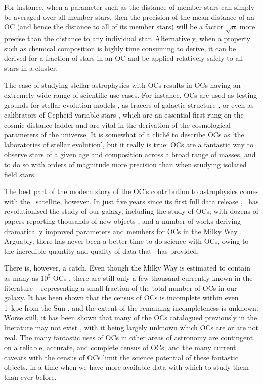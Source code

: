 For instance, when a parameter such as the distance of member stars can simply be averaged over all member stars, then the precision of the mean distance of an OC (and hence the distance to all of its member stars) will be a factor $\sqrt{n}$ more precise than the distance to any individual star. Alternatively, when a property such as chemical composition is highly time consuming to derive, it can be derived for a fraction of stars in an OC and be applied relatively safely to all stars in a cluster.

The ease of studying stellar astrophysics with OCs results in OCs having an extremely wide range of scientific use cases. For instance, OCs are used as testing grounds for stellar evolution models \citep{bressan_parsec_2012}, as tracers of galactic structure \citep{cantat-gaudin_painting_2020,castro-ginard_milky_2021}, or even as calibrators of Cepheid variable stars \citep{medina_revisited_2021}, which are an essential first rung on the cosmic distance ladder and are vital in the derivation of the cosmological parameters of the universe. It is somewhat of a cliché to describe OCs as `the laboratories of stellar evolution', but it really is true: OCs are a fantastic way to observe stars of a given age and composition across a broad range of masses, and to do so with orders of magnitude more precision than when studying isolated field stars.

The best part of the modern story of the OC's contribution to astrophysics comes with the \gaia\ satellite, however. In just five years since its first full data release \citep{brown_gaia_2018}, \gaia\ has revolutionised the study of our galaxy, including the study of OCs; with dozens of papers reporting thousands of new objects \citep[e.g.][]{liu_catalog_2019,castro-ginard_hunting_2019,castro-ginard_hunting_2020,castro-ginard_hunting_2022}, and a number of works deriving dramatically improved parameters and members for OCs in the Milky Way \citep[e.g.][]{cantat-gaudin_gaia_2018,tarricq_3d_2020}. Arguably, there has never been a better time to do science with OCs, owing to the incredible quantity and quality of data that \gaia\ has provided.

There is, however, a catch. Even though the Milky Way is estimated to contain as many as $10^5$ OCs \citep{dias_new_2002}, there are still only a few thousand currently known in the literature -- representing a small fraction of the total number of OCs in our galaxy. It has been shown that the census of OCs is incomplete within even 1~kpc from the Sun \citep[e.g.][]{castro-ginard_new_2018}, and the extent of the remaining incompleteness is unknown. Worse still, it has been shown that many of the OCs catalogued previously in the literature may not exist \citep{cantat-gaudin_clusters_2020,piatti_catching_2023}, with it being largely unknown which OCs are or are not real. The many fantastic uses of OCs in other areas of astronomy are contingent on a reliable, accurate, and complete census of OCs; and the many current caveats with the census of OCs limit the science potential of these fantastic objects, in a time when we have more available data with which to study them than ever before.


